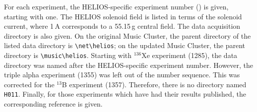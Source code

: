 For each experiment, the HELIOS-specific experiment number (\astrosun) is given, starting with one.  The HELIOS solenoid field is listed in terms of the solenoid current, where 1\,A corresponds to a 55.15\,g central field.    The data acquisition directory is also given.  On the original Music Cluster, the parent directory of the listed data directory is \verb|\net\helios|; on the updated Music Cluster, the parent directory is \verb|\music\helios|.  Starting with $^{136}$Xe experiment (1285), the data directory was named after the HELIOS-specific experiment number.  However, the triple alpha experiment (1355) was left out of the number sequence.  This was corrected for the $^{13}$B experiment (1357).  Therefore, there is no directory named \texttt{H011}.  Finally, for those experiments which have had their results published, the corresponding reference is given.
